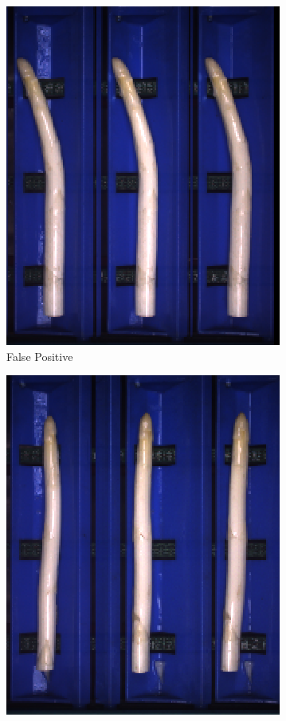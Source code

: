 \begin{figure}[h]
	\begin{subfigure}{0.3\textwidth}
		\includegraphics[width=0.9\linewidth]{Figures/appendix/verythin_falsepositive_01.png}
		\vspace{-5pt}
		\caption{False Positive}
	\end{subfigure}
	\begin{subfigure}{0.3\textwidth}
		\includegraphics[width=0.9\linewidth]{Figures/appendix/verythin_falsepositive_02.png}

\end{subfigure}
\end{figure}
